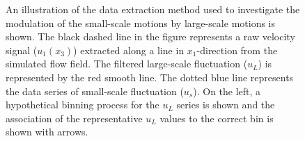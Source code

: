 \begin{figure}[htb]
\caption{An illustration of the data extraction method used to investigate the modulation of the small-scale motions by large-scale motions is shown. The black dashed line in the figure represents a raw velocity signal ($u_1(x_3)$) extracted along a line in $x_1$-direction from the simulated flow field. The filtered large-scale fluctuation ($u_L$) is represented by the red smooth line. The dotted blue line represents the data series of small-scale fluctuation ($u_s$). On the left, a hypothetical binning process for the $u_L$ series is shown and  the association of the representative $u_L$ values to the correct bin is shown with arrows.}
\label{fig:modulation}
\end{figure}


